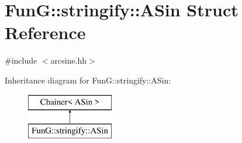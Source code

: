 \hypertarget{structFunG_1_1stringify_1_1ASin}{\section{Fun\-G\-:\-:stringify\-:\-:A\-Sin Struct Reference}
\label{structFunG_1_1stringify_1_1ASin}
}


{\ttfamily \#include $<$arcsine.\-hh$>$}

Inheritance diagram for Fun\-G\-:\-:stringify\-:\-:A\-Sin\-:\begin{figure}[H]
\begin{center}
\leavevmode
\includegraphics[height=2.000000cm]{structFunG_1_1stringify_1_1ASin}
\end{center}
\end{figure}
